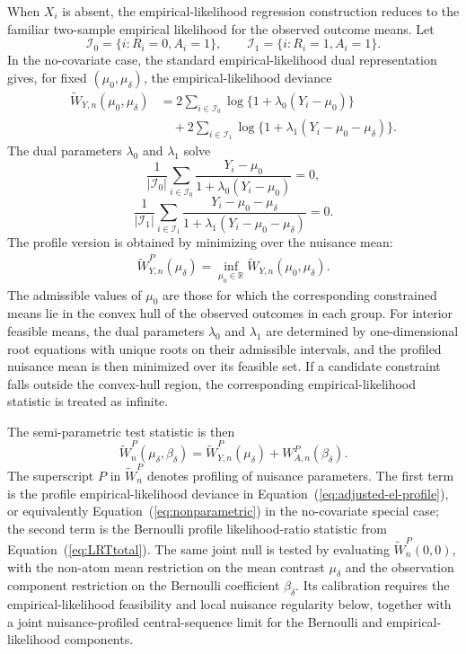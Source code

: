 \documentclass[11pt]{article}
\begin{document}
When $X_i$ is absent, the empirical-likelihood regression construction reduces to the familiar two-sample empirical likelihood for the observed outcome means. Let
\[
\mathcal{I}_0 = \{i:R_i = 0, A_i = 1\},
\qquad
\mathcal{I}_1 = \{i:R_i = 1, A_i = 1\}.
\]
In the no-covariate case, the standard empirical-likelihood dual representation gives, for fixed $(\mu_0,\mu_\delta)$, the empirical-likelihood deviance
\begin{align}
  \widetilde{W}_{Y,n}(\mu_0,\mu_\delta)
  &=2\sum_{i\in\mathcal{I}_0}
    \log\{1+\lambda_0(Y_i-\mu_0)\}\nonumber\\
  &\quad+2\sum_{i\in\mathcal{I}_1}
    \log\{1+\lambda_1(Y_i-\mu_0-\mu_\delta)\}.\label{eq:nonparametric}
\end{align}
The dual parameters $\lambda_0$ and $\lambda_1$ solve
\[
\frac{1}{|\mathcal{I}_0|}\sum_{i\in\mathcal{I}_0}
\frac{Y_i-\mu_0}{1+\lambda_0(Y_i-\mu_0)}=0,
\]
\[
\frac{1}{|\mathcal{I}_1|}\sum_{i\in\mathcal{I}_1}
\frac{Y_i-\mu_0-\mu_\delta}{1+\lambda_1(Y_i-\mu_0-\mu_\delta)}=0.
\]
The profile version is obtained by minimizing over the nuisance mean:
\begin{align*}
  \widetilde{W}_{Y,n}^P(\mu_\delta) = \inf_{\mu_0 \in \mathbb{R}} \widetilde{W}_{Y,n}(\mu_0,\mu_\delta).
\end{align*}
The admissible values of $\mu_0$ are those for which the corresponding constrained means lie in the convex hull of the observed outcomes in each group. For interior feasible means, the dual parameters $\lambda_0$ and $\lambda_1$ are determined by one-dimensional root equations with unique roots on their admissible intervals, and the profiled nuisance mean is then minimized over its feasible set. If a candidate constraint falls outside the convex-hull region, the corresponding empirical-likelihood statistic is treated as infinite.

The semi-parametric test statistic is then
\begin{equation}
  \widetilde{W}_n^P(\mu_\delta, \beta_\delta)
  = \widetilde{W}_{Y,n}^P(\mu_\delta) + W_{A,n}^P(\beta_\delta).\label{eq:LRT_SP_total}
\end{equation}
The superscript $P$ in $\widetilde{W}_n^P$ denotes profiling of nuisance parameters. The first term is the profile empirical-likelihood deviance in Equation~(\ref{eq:adjusted-el-profile}), or equivalently Equation~(\ref{eq:nonparametric}) in the no-covariate special case; the second term is the Bernoulli profile likelihood-ratio statistic from Equation~(\ref{eq:LRTtotal}). The same joint null is tested by evaluating $\widetilde{W}_n^P(0,0)$, with the non-atom mean restriction on the mean contrast $\mu_\delta$ and the observation component restriction on the Bernoulli coefficient $\beta_\delta$. Its calibration requires the empirical-likelihood feasibility and local nuisance regularity below, together with a joint nuisance-profiled central-sequence limit for the Bernoulli and empirical-likelihood components.
\end{document}
